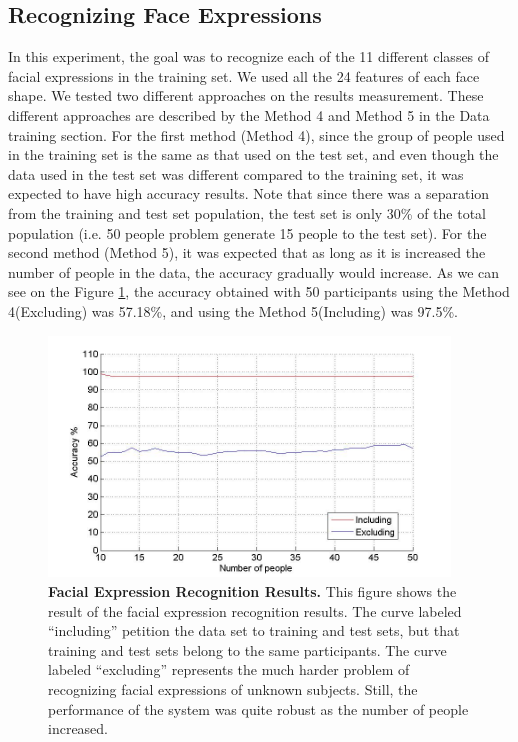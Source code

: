 \documentclass[]{article}
\begin{document}
\subsection{Recognizing Face Expressions}
In this experiment, the goal was to recognize each of the 11 different classes of facial expressions in the training
set. We used all the 24 features of each face shape. We tested two different approaches on the results measurement.
These different approaches are described by the Method 4 and Method 5 in the Data training section.
For the first method (Method 4), since the group of people used in the training set is the same as that used on the test
set, and even though the data used in the test set was different compared to the training set, it was expected to have
high accuracy results. Note that since there was a separation from the training and test set population, the test set is
only 30\% of the total population (i.e. 50 people problem generate 15 people to the test set).
For the second method (Method 5), it was expected that as long as it is increased the number of people in the data, the
accuracy gradually would increase. As we can see on the Figure \ref{identityRecognition}, the accuracy obtained with 50 participants using the Method
4(Excluding) was 57.18\%, and using the Method 5(Including) was 97.5\%.
 

\begin{figure}[ht]
\begin{center}
\vspace{-3mm}
\includegraphics[width=0.95\textwidth]{figures/figureRecognizeFacialExpressionTrue.jpg}
\end{center}
\caption{\textbf{Facial Expression Recognition Results.} This figure shows the result of the facial expression recognition results.
The curve labeled ``including'' petition the data set to training and test sets, but that training and test sets belong to the same participants.
The curve labeled ``excluding'' represents the much harder problem of recognizing facial expressions of unknown subjects. Still, 
the performance of the system was quite robust as the number of people increased.}
\label{identityRecognition}
\end{figure}
\end{document}

